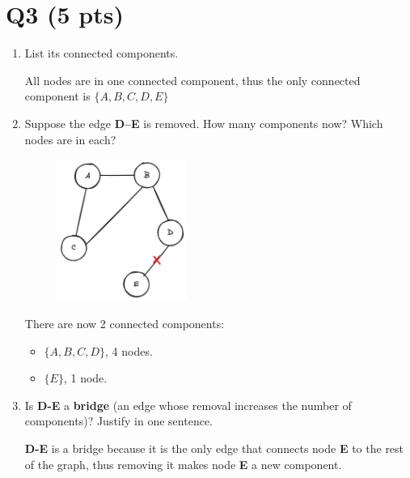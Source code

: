 \documentclass{article}
\begin{document}
\section*{Q3 (5 pts)}

\begin{enumerate}
    \item {
        List its connected components.

        All nodes are in one connected component, thus the only connected
        component is \(\{A, B, C, D, E\}\)
    }

    \item {
        Suppose the edge \textbf{D–E} is removed.
        How many components now? Which nodes are in each?

        \begin{figure}[htbp]
            \centering
            \includegraphics[width=0.4\textwidth]{graph_no_DE.png}
        \end{figure}

        There are now 2 connected components:
        \begin{itemize}
            \item \(\{A, B, C, D\}\), 4 nodes.
            \item \(\{E\}\), 1 node.
        \end{itemize}
    }

    \item {
        Is \textbf{D-E} a \textbf{bridge} (an edge whose removal increases the 
        number of components)? Justify in one sentence.

        \textbf{D-E} is a bridge because it is the only edge that connects node 
        \textbf{E} to the rest of the graph, thus removing it makes node \textbf{E}
        a new component.
    }
\end{enumerate}
\end{document}
